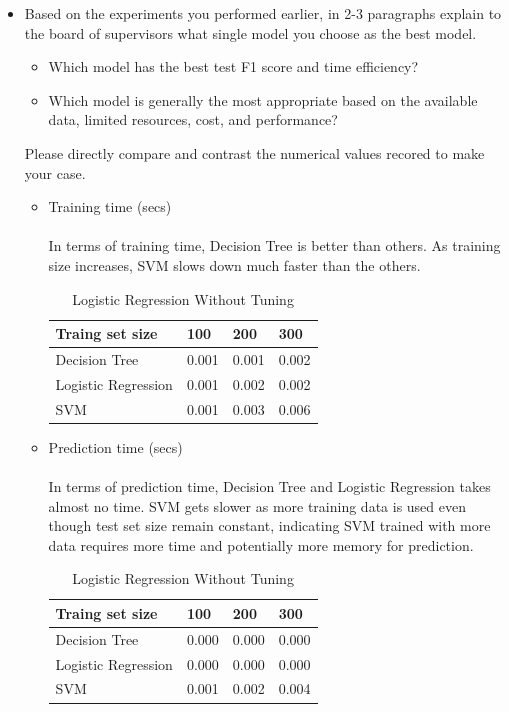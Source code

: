 \documentclass{article}
\begin{document}
\begin{itemize}
\item Based on the experiments you performed earlier, in 2-3 paragraphs explain to the board of supervisors what single model you choose as the best model. 
\begin{itemize}
\item Which model has the best test F1 score and time efficiency? 
\item Which model is generally the most appropriate based on the available data, limited resources, cost, and performance? 
\end{itemize}
Please directly compare and contrast the numerical values recored to make your case.
\\
\color{blue}
\begin{itemize}
\item Training time (secs) 
\\\\
In terms of training time, Decision Tree is better than others.  As training size increases, SVM slows down much faster than the others.\\
\begin{table}[H]
\centering
\begin{tabular}{| l | l | l | l |}
\hline
Traing set size           & 100 & 200 & 300 \\
\hline
Decision Tree            & 0.001 & 0.001 & 0.002 \\
\hline
Logistic Regression      & 0.001 & 0.002 & 0.002 \\
\hline
SVM                      & 0.001 & 0.003 & 0.006 \\
\hline      
\end{tabular}
\caption{Logistic Regression Without Tuning}
\end{table}

\item Prediction time (secs)
\\\\
In terms of prediction time, Decision Tree and Logistic Regression takes almost no time.  SVM gets slower as more training data is used even though test set size remain constant, indicating SVM trained with more data requires more time and potentially more memory for prediction.
\\
\begin{table}[H]
\centering
\begin{tabular}{| l | l | l | l |}
\hline
Traing set size           & 100 & 200 & 300 \\
\hline
Decision Tree            & 0.000 & 0.000 & 0.000 \\
\hline
Logistic Regression      & 0.000 & 0.000 & 0.000 \\
\hline
SVM                      & 0.001 & 0.002 & 0.004 \\
\hline      
\end{tabular}
\caption{Logistic Regression Without Tuning}
\end{table}


\end{itemize}
\end{itemize}
\end{document}
